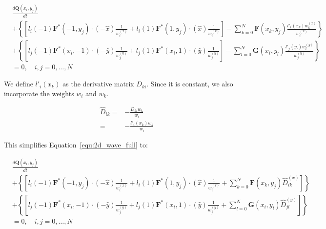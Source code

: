 \begin{equation} \label{equ:2d_wave_full}
    \begin{split}
        & \frac{d\mathbf{Q}(x_i, y_j)}{dt} \\
        & + \left \{ \left[ l_i \left( -1 \right) \mathbf{F}^* \left( -1, y_j \right) \cdot \left( -\widehat{x} \right) \frac{1}{w_i^{ \left( x \right) }} + l_i \left( 1 \right) \mathbf{F}^* \left( 1, y_j \right) \cdot
        \left( \widehat{x} \right) \frac{1}{w_i^{ \left( x \right) }} \right] - \sum_{k = 0}^{N} \mathbf{F} \left(x_k, y_j \right) \frac{l'_i \left( x_k \right) w_k^{ \left( x \right) }}{w_i^{ \left( x \right) }} \right \} \\
        & + \left \{ \left[ l_j \left( -1 \right) \mathbf{F}^* (x_i, -1) \cdot \left( -\widehat{y} \right) \frac{1}{w_j^{ \left( y \right) }} + l_j \left( 1 \right) \mathbf{F}^*(x_i, 1) \cdot
        \left( \widehat{y} \right) \frac{1}{w_j^{ \left( y \right) }} \right] - \sum_{l = 0}^{N} \mathbf{G} \left(x_i, y_l \right) \frac{l'_j \left( y_l \right) w_l^{ \left( y \right) }}{w_j^{ \left( y \right) }} \right \} \\
        & = 0, \quad i,j = 0, \ldots, N
    \end{split} 
\end{equation}

We define \(l'_i(x_k)\) as the derivative matrix \(D_{k i}\). Since it is constant, we also
incorporate the weights \(w_i\) and \(w_k\).

\begin{equation} \label{equ:d_hat}
    \begin{split}
        \widehat{D}_{i k} = & -\frac{D_{k i} w_k}{w_i} \\
        = & -\frac{l'_i(x_k) w_k}{w_i}
    \end{split} 
\end{equation}

This simplifies Equation~\ref{equ:2d_wave_full} to:

\begin{equation} \label{equ:2d_wave_d}
    \begin{split}
        & \frac{d\mathbf{Q}(x_i, y_j)}{dt} \\
        & + \left \{ \left[ l_i \left( -1 \right) \mathbf{F}^* \left( -1, y_j \right) \cdot \left( -\widehat{x} \right) \frac{1}{w_i^{ \left( x \right) }} + l_i \left( 1 \right) \mathbf{F}^* \left( 1, y_j \right) \cdot
        \left( \widehat{x} \right) \frac{1}{w_i^{ \left( x \right) }} + \sum_{k = 0}^{N} \mathbf{F} \left( x_k, y_j \right) \widehat{D}_{i k}^{ \left( x \right) } \right] \right \} \\
        & + \left \{ \left [ l_j \left( -1 \right) \mathbf{F}^* \left( x_i, -1 \right) \cdot \left( -\widehat{y} \right) \frac{1}{w_j^{ \left( y \right) }} + l_j \left( 1 \right) \mathbf{F}^* \left(x_i, 1 \right) \cdot
        \left( \widehat{y} \right) \frac{1}{w_j^{ \left( y \right) }} + \sum_{l = 0}^{N} \mathbf{G} \left( x_i, y_l \right) \widehat{D}_{j l}^{ \left( y \right) } \right] \right \} \\
        & = 0, \quad i,j = 0, \ldots, N
    \end{split}
\end{equation}

